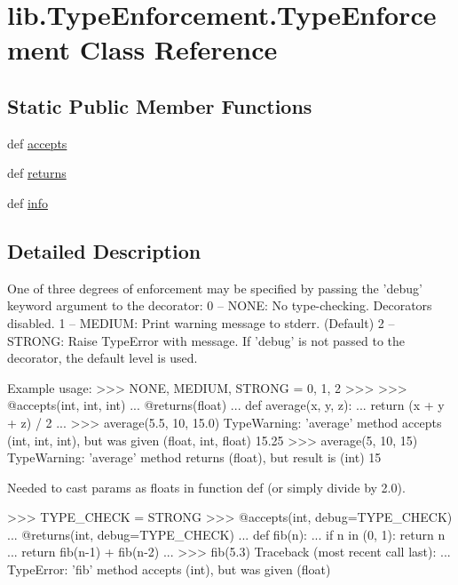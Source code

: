\hypertarget{classlib_1_1_type_enforcement_1_1_type_enforcement}{\section{lib.\-Type\-Enforcement.\-Type\-Enforcement Class Reference}
\label{classlib_1_1_type_enforcement_1_1_type_enforcement}
}
\subsection*{Static Public Member Functions}
\begin{DoxyCompactItemize}
\item 
def \hyperlink{classlib_1_1_type_enforcement_1_1_type_enforcement_ae70a2e6648080281c6ac8994e99290d4}{accepts}
\item 
def \hyperlink{classlib_1_1_type_enforcement_1_1_type_enforcement_a1d3ec380894125b8f701c1124afb62e8}{returns}
\item 
def \hyperlink{classlib_1_1_type_enforcement_1_1_type_enforcement_ae443f2e86f45cfb36747a2a9ae308be5}{info}
\end{DoxyCompactItemize}


\subsection{Detailed Description}
\begin{DoxyVerb}One of three degrees of enforcement may be specified by passing
the 'debug' keyword argument to the decorator:
    0 -- NONE:   No type-checking. Decorators disabled.
    1 -- MEDIUM: Print warning message to stderr. (Default)
    2 -- STRONG: Raise TypeError with message.
If 'debug' is not passed to the decorator, the default level is used.

Example usage:
    >>> NONE, MEDIUM, STRONG = 0, 1, 2
    >>>
    >>> @accepts(int, int, int)
    ... @returns(float)
    ... def average(x, y, z):
    ...     return (x + y + z) / 2
    ...
    >>> average(5.5, 10, 15.0)
    TypeWarning:  'average' method accepts (int, int, int), but was given
    (float, int, float)
    15.25
    >>> average(5, 10, 15)
    TypeWarning:  'average' method returns (float), but result is (int)
    15

Needed to cast params as floats in function def (or simply divide by 2.0).

    >>> TYPE_CHECK = STRONG
    >>> @accepts(int, debug=TYPE_CHECK)
    ... @returns(int, debug=TYPE_CHECK)
    ... def fib(n):
    ...     if n in (0, 1): return n
    ...     return fib(n-1) + fib(n-2)
    ...
    >>> fib(5.3)
    Traceback (most recent call last):
      ...
    TypeError: 'fib' method accepts (int), but was given (float)\end{DoxyVerb}
 

